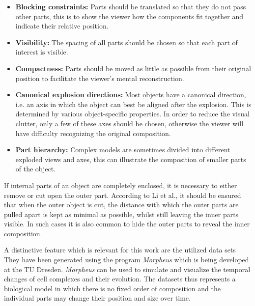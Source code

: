 \begin{itemize}
	\item \textbf{Blocking constraints:} Parts should be translated so that they do not pass other parts, this is to show the viewer how the components fit together and indicate their relative position.
	\item \textbf{Visibility:} The spacing of all parts should be chosen so that each part of interest is visible.
	\item \textbf{Compactness:} Parts should be moved as little as possible from their original position to facilitate the viewer's mental reconstruction.
	\item \textbf{Canonical explosion directions:} Most objects have a canonical direction, i.e. an axis in which the object can best be aligned after the explosion. This is determined by various object-specific properties. In order to reduce the visual clutter, only a few of these axes should be chosen, otherwise the viewer will have difficulty recognizing the original composition.
	\item \textbf{Part hierarchy:} Complex models are sometimes divided into different exploded views and axes, this can illustrate the composition of smaller parts of the object.
\end{itemize}

If internal parts of an object are completely enclosed, it is necessary to either remove or cut open the outer part. According to Li et al., it should be ensured that when the outer object is cut, the distance with which the outer parts are pulled apart is kept as minimal as possible, whilst still leaving the inner parts visible. %
In such cases it is also common to hide the outer parts to reveal the inner composition. %

A distinctive feature which is relevant for this work are the utilized data sets
They have been generated using the program \emph{Morpheus} which is being developed at the TU Dresden. %
\emph{Morpheus} can be used to simulate and visualize the temporal changes of cell complexes and their evolution. 
The datasets thus represents a biological model in which there is no fixed order of composition and the individual parts may change their position and size over time.  